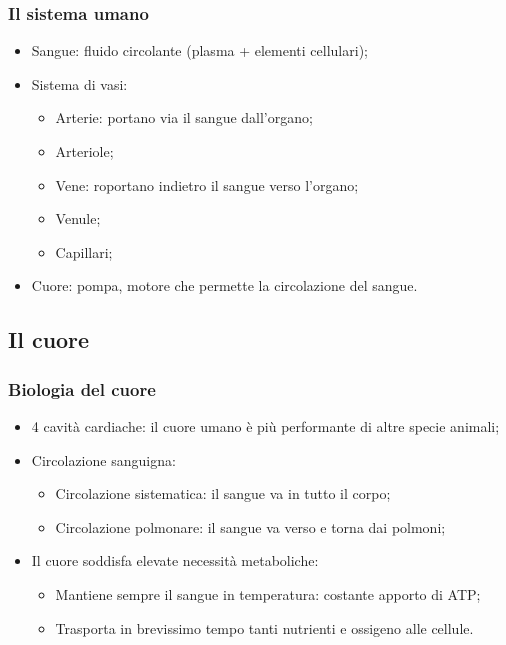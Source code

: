 \documentclass{article}
\begin{document}
\subsubsection{Il sistema umano}
\begin{itemize}
    \item Sangue: fluido circolante (plasma + elementi cellulari);
    \item Sistema di vasi:
        \begin{itemize}
            \item Arterie: portano via il sangue dall'organo;
            \item Arteriole;
            \item Vene: roportano indietro il sangue verso l'organo;
            \item Venule;
            \item Capillari;
        \end{itemize}
    \item Cuore: pompa, motore che permette la circolazione del sangue.
\end{itemize}

\subsection{Il cuore}
\subsubsection{Biologia del cuore}
\begin{itemize}
    \item 4 cavità cardiache: il cuore umano è più performante di altre specie animali;
    \item Circolazione sanguigna:
        \begin{itemize}
            \item Circolazione sistematica: il sangue va in tutto il corpo;
            \item Circolazione polmonare: il sangue va verso e torna dai polmoni;
        \end{itemize}
    \item Il cuore soddisfa elevate necessità metaboliche:
        \begin{itemize}
            \item Mantiene sempre il sangue in temperatura: costante apporto di ATP;
            \item Trasporta in brevissimo tempo tanti nutrienti e ossigeno alle cellule.
        \end{itemize}
\end{itemize}
\end{document}
